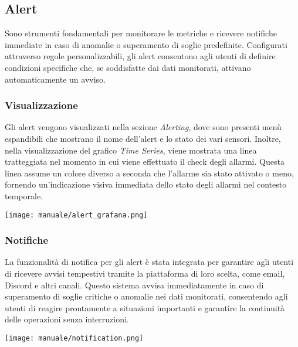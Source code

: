 
\subsection{Alert}
Sono strumenti fondamentali per monitorare le metriche e ricevere notifiche immediate in caso di anomalie o superamento di soglie predefinite. Configurati attraverso regole personalizzabili, gli alert consentono agli utenti di definire condizioni specifiche che, se soddisfatte dai dati monitorati, attivano automaticamente un avviso.
\subsubsection{Visualizzazione}
Gli alert vengono visualizzati nella sezione \textit{Alerting}, dove sono presenti menù espandibili che mostrano il nome dell'alert e lo stato dei vari sensori. Inoltre, nella visualizzazione del grafico \textit{Time Series}, viene mostrata una linea tratteggiata nel momento in cui viene effettuato il check degli allarmi. Questa linea assume un colore diverso a seconda che l'allarme sia stato attivato o meno, fornendo un'indicazione visiva immediata dello stato degli allarmi nel contesto temporale.

\begin{center}
    \texttt{[image: manuale/alert\_grafana.png]}
\end{center} 

\subsubsection{Notifiche}
La funzionalità di notifica per gli alert è stata integrata per garantire agli utenti di ricevere avvisi tempestivi tramite la piattaforma di loro scelta, come email, Discord e altri canali. Questo sistema avvisa immediatamente in caso di superamento di soglie critiche o anomalie nei dati monitorati, consentendo agli utenti di reagire prontamente a situazioni importanti e garantire la continuità delle operazioni senza interruzioni.
\begin{center}
    \texttt{[image: manuale/notification.png]}
\end{center} 

